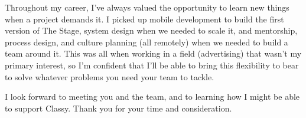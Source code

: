 Throughout my career, I've always valued the opportunity to learn new things when a project demands it.
I picked up mobile development to build the first version of The Stage, system design when we needed to scale it,
and mentorship, process design, and culture planning (all remotely) when we needed to build a team around it.
This was all when working in a field (advertising) that wasn't my primary interest,
so I'm confident that I'll be able to bring this flexibility to bear to solve whatever problems
you need your team to tackle.

I look forward to meeting you and the team, and to learning how I might be able to support Classy.
Thank you for your time and consideration.


\vspace{10pt}

\makeletterclosing


